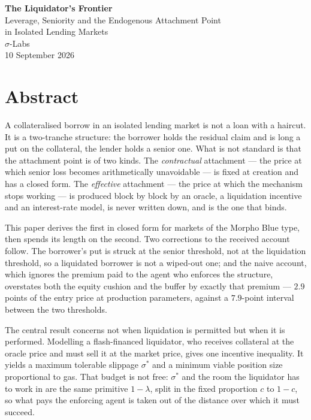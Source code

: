 \documentclass[11pt,a4paper]{article}
\theoremstyle{plain}
\theoremstyle{definition}
\theoremstyle{remark}
\begin{document}
\begin{titlepage}
\vspace*{7.5cm}
\begin{center}
{\LARGE\bfseries The Liquidator's Frontier}\\[0.9em]
{\large Leverage, Seniority and the Endogenous Attachment Point\\ in Isolated Lending Markets}\\[2.6em]
{\normalsize $\sigma$-Labs}\\[0.9em]
{\normalsize 10 September 2026}
\end{center}
\end{titlepage}

\newpage
\section*{Abstract}
\thispagestyle{fancy}

A collateralised borrow in an isolated lending market is not a loan with a haircut. It is a
two-tranche structure: the borrower holds the residual claim and is long a put on the collateral,
the lender holds a senior one. What is not standard is that the attachment point is of two kinds.
The \emph{contractual} attachment --- the price at which senior loss becomes arithmetically
unavoidable --- is fixed at creation and has a closed form. The \emph{effective} attachment ---
the price at which the mechanism stops working --- is produced block by block by an oracle, a
liquidation incentive and an interest-rate model, is never written down, and is the one that binds.

This paper derives the first in closed form for markets of the Morpho Blue type, then spends its
length on the second. Two corrections to the received account follow. The borrower's put is struck
at the senior threshold, not at the liquidation threshold, so a liquidated borrower is not a
wiped-out one; and the naive account, which ignores the premium paid to the agent who enforces the
structure, overstates both the equity cushion and the buffer by exactly that premium --- $2.9$
points of the entry price at production parameters, against a $7.9$-point interval between the two
thresholds.

The central result concerns not when liquidation is permitted but when it is performed. Modelling
a flash-financed liquidator, who receives collateral at the oracle price and must sell it at the
market price, gives one incentive inequality. It yields a maximum tolerable slippage $\sigma^{*}$
and a minimum viable position size proportional to gas. That budget is not free: $\sigma^{*}$ and
the room the liquidator has to work in are the same primitive $1-\lambda$, split in the fixed
proportion $c$ to $1-c$, so what pays the enforcing agent is taken out of the distance over which
it must succeed.
\end{document}
